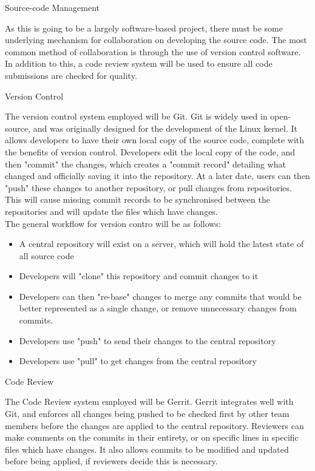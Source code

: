 \documentclass{report}
\begin{document}
\begin{section}{Source-code Management}

As this is going to be a largely software-based project, there must be some
underlying mechanism for collaboration on developing the source code. The most
common method of collaboration is through the use of version control software.
In addition to this, a code review system will be used to ensure all code
submissions are checked for quality.

\begin{subsection}{Version Control}

The version control system employed will be Git. Git is widely used in
open-source, and was originally designed for the development of the Linux
kernel. It allows developers to have their own local copy of the source code,
complete with the benefits of version control. Developers edit the local copy
of the code, and then "commit" the changes, which creates a "commit record"
detailing what changed and officially saving it into the repository. At a later
date, users can then "push" these changes to another repository, or pull
changes from repositories. This will cause missing commit records to be
synchronised between the repositories and will update the files which have
changes. \\

The general workflow for version contro will be as follows:\\

\begin{itemize}
\item A central repository will exist on a server, which will hold the latest state of all source code
\item Developers will "clone" this repository and commit changes to it
\item Developers can then "re-base" changes to merge any commits that would be
better represented as a single change, or remove unnecessary changes from
commits.
\item Developers use "push" to send their changes to the central repository
\item Developers use "pull" to get changes from the central repository
\end{itemize}

\end{subsection}

\begin{subsection}{Code Review}

The Code Review system employed will be Gerrit. Gerrit integrates well with
Git, and enforces all changes being pushed to be checked first by other team
members before the changes are applied to the central repository. Reviewers can
make comments on the commits in their entirety, or on specific lines in
specific files which have changes. It also allows commits to be modified and
updated before being applied, if reviewers decide this is necessary. \\


\end{subsection}
\end{section}
\end{document}
